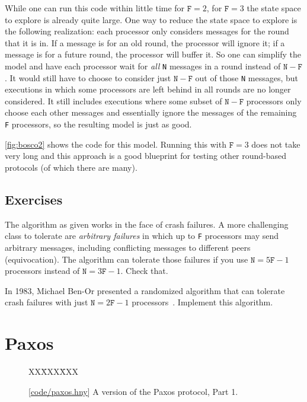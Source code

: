 \documentclass{report}
\newcommand{\harmonysource}[1]{
\begin{tabbing}
XX\=XXX\=XXX\kill
    
\end{tabbing}
}
\newcommand{\harmonylink}[1]{%
[\href{https://harmony.cs.cornell.edu/#1}{\underline{#1}}]%
}
\newenvironment{code}{
\tcolorbox
}{
\endtcolorbox
}
\begin{document}
While one can run this code within little time for $\mathtt{F} = 2$, for
$\mathtt{F} = 3$ the state space to explore is already quite large.
One way to reduce the state space to explore is the following realization:
each processor only considers messages for the round that it is in.
If a message is for an old round, the processor will ignore it;
if a message is for a future round, the processor will buffer it.
So one can simplify the model and have each processor wait
for \emph{all} \texttt{N} messages in a round
instead of $\mathtt{N} - \mathtt{F}$.
It would still have to choose to consider just $\mathtt{N} - \mathtt{F}$
out of those \texttt{N} messages, but executions in which some processors
are left behind in all rounds are no longer considered.
It still includes executions where some subset of $\mathtt{N} - \mathtt{F}$
processors only choose each other messages and essentially ignore the
messages of the remaining \texttt{F} processors, so the resulting model
is just as good.

\autoref{fig:bosco2} shows the code for this model.  Running this with
$\mathtt{F} = 3$ does not take very long and this approach is a good
blueprint for testing other round-based protocols (of which there are
many).

\section*{Exercises}
\begin{problems}
\item The algorithm as given works in the face of crash failures.
A more challenging class to tolerate are \emph{arbitrary failures} in
which up to \texttt{F} processors may send arbitrary messages, including
conflicting messages to different peers (equivocation).
The algorithm can tolerate those failures if you use $\mathtt{N} = 5\mathtt{F} - 1$ processors instead of $\mathtt{N} = 3\mathtt{F} - 1$.  Check that.
\item In 1983, Michael Ben-Or presented a randomized algorithm that can
tolerate crash failures with
just $\mathtt{N} = 2\mathtt{F} - 1$ processors~\cite{BenOr83}.
Implement this algorithm.
\end{problems}

\chapter{Paxos}
\label{ch:paxos}

\begin{figure}
\begin{code}
\harmonysource{paxos1}
\end{code}
\caption{\harmonylink{code/paxos.hny} A version of the Paxos protocol, Part 1.}
\label{fig:paxos1}
\end{figure}
\end{document}
